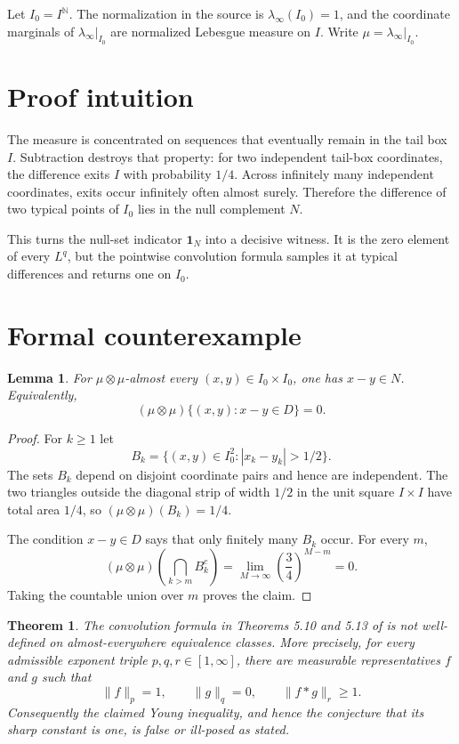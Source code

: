 \documentclass[11pt]{article}
\newtheorem{theorem}{Theorem}
\newtheorem{lemma}{Lemma}
\newcommand{\N}{\mathbb N}
\begin{document}
Let $I_0=I^\N$.  The normalization in the source is
$\lambda_\infty(I_0)=1$, and the coordinate marginals of
$\lambda_\infty|_{I_0}$ are normalized Lebesgue measure on $I$.
Write $\mu=\lambda_\infty|_{I_0}$.

\section{Proof intuition}
The measure is concentrated on sequences that eventually remain in the tail
box $I$.  Subtraction destroys that property: for two independent tail-box
coordinates, the difference exits $I$ with probability $1/4$.  Across
infinitely many independent coordinates, exits occur infinitely often almost
surely.  Therefore the difference of two typical points of $I_0$ lies in the
null complement $N$.

This turns the null-set indicator $\mathbf1_N$ into a decisive witness.  It is
the zero element of every $L^q$, but the pointwise convolution formula samples
it at typical differences and returns one on $I_0$.

\section{Formal counterexample}
\begin{lemma}\label{lem:difference}
For $\mu\otimes\mu$-almost every $(x,y)\in I_0\times I_0$, one has $x-y\in N$.
Equivalently,
\[
 (\mu\otimes\mu)\{(x,y):x-y\in D\}=0.
\]
\end{lemma}

\begin{proof}
For $k\geq1$ let
\[
 B_k=\{(x,y)\in I_0^2:|x_k-y_k|>1/2\}.
\]
The sets $B_k$ depend on disjoint coordinate pairs and hence are independent.
The two triangles outside the diagonal strip of width $1/2$ in the unit square
$I\times I$ have total area $1/4$, so
$(\mu\otimes\mu)(B_k)=1/4$.

The condition $x-y\in D$ says that only finitely many $B_k$ occur.  For every
$m$,
\[
 (\mu\otimes\mu)\left(\bigcap_{k>m}B_k^c\right)
 =\lim_{M\to\infty}\left(\frac34\right)^{M-m}=0.
\]
Taking the countable union over $m$ proves the claim.
\end{proof}

\begin{theorem}\label{thm:counterexample}
The convolution formula in Theorems 5.10 and 5.13 of \cite{GPZ} is not
well-defined on almost-everywhere equivalence classes.  More precisely, for
every admissible exponent triple $p,q,r\in[1,\infty]$, there are measurable
representatives $f$ and $g$ such that
\[
 \|f\|_p=1,\qquad \|g\|_q=0,\qquad \|f*g\|_r\geq1.
\]
Consequently the claimed Young inequality, and hence the conjecture that its
sharp constant is one, is false or ill-posed as stated.
\end{theorem}
\end{document}
